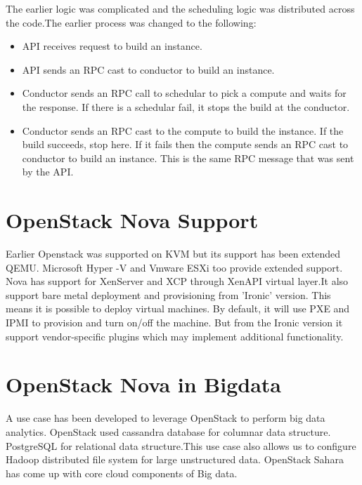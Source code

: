 \documentclass[9pt,twocolumn,twoside]{../../styles/osajnl}
\begin{document}
The earlier logic was complicated and the scheduling logic was distributed across the code.The earlier process was changed to the following:


\begin{itemize}
\item API receives request to build an instance.
\item API sends an RPC cast to conductor to build an instance.
\item Conductor sends an RPC call to schedular to pick a compute and waits for the response. If there is a schedular fail, it stops the build at the conductor.
\item Conductor sends an RPC cast to the compute to build the instance. If the build succeeds, stop here. If it fails then the compute sends an RPC cast to conductor to build an instance. This is the same RPC message that was sent by the API.

\end{itemize}



\section{OpenStack Nova Support}
Earlier Openstack was supported on KVM but its support has been extended QEMU. Microsoft Hyper -V and Vmware ESXi too provide extended support. Nova has support for XenServer and XCP through XenAPI virtual layer.It also support bare metal deployment and provisioning from 'Ironic' version. This means it is possible to deploy virtual machines. By default, it will use PXE and IPMI to provision and turn on/off the machine. But from the Ironic version it support vendor-specific plugins which may implement additional functionality. 


\section{OpenStack Nova in Bigdata}

A use case has been developed to leverage OpenStack to perform big data analytics. OpenStack used cassandra database for columnar data structure. PostgreSQL for relational data structure.This use case also allows us to configure Hadoop distributed file system for large unstructured data. OpenStack Sahara has come up with core cloud components of Big data\cite{www-nova-bigdata}.
\end{document}
